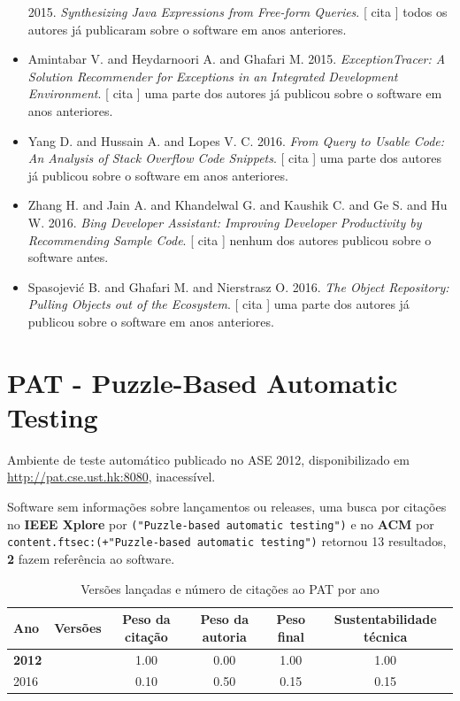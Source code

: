 \begin{itemize}
      2015.
        \textit{ Synthesizing Java Expressions from Free-form Queries}.
      [
          cita
      ]
todos os autores já publicaram sobre o software em anos anteriores.
\item Amintabar V. and Heydarnoori A. and Ghafari M.
      2015.
        \textit{ ExceptionTracer: A Solution Recommender for Exceptions in an Integrated Development Environment}.
      [
          cita
      ]
uma parte dos autores já publicou sobre o software em anos anteriores.
\item Yang D. and Hussain A. and Lopes V. C.
      2016.
        \textit{ From Query to Usable Code: An Analysis of Stack Overflow Code Snippets}.
      [
          cita
      ]
uma parte dos autores já publicou sobre o software em anos anteriores.
\item Zhang H. and Jain A. and Khandelwal G. and Kaushik C. and Ge S. and Hu W.
      2016.
        \textit{ Bing Developer Assistant: Improving Developer Productivity by Recommending Sample Code}.
      [
          cita
      ]
nenhum dos autores publicou sobre o software antes.
\item Spasojevi\'{c} B. and Ghafari M. and Nierstrasz O.
      2016.
        \textit{ The Object Repository: Pulling Objects out of the Ecosystem}.
      [
          cita
      ]
uma parte dos autores já publicou sobre o software em anos anteriores.
\end{itemize}
\section{PAT - Puzzle-Based Automatic Testing}

Ambiente de teste automático
publicado no ASE 2012,
disponibilizado em \url{http://pat.cse.ust.hk:8080},
inacessível.

Software sem informações sobre lançamentos ou releases,
uma busca por citações no {\bf IEEE Xplore} por
\texttt{("Puzzle-based automatic testing")}
e no {\bf ACM} por
\texttt{content.ftsec:(+"Puzzle-based automatic testing")}
retornou
13 resultados,
{\bf 2} fazem referência ao software.


\begin{table}[H]
\caption{Versões lançadas e número de citações ao PAT por ano}
\centering
\begin{tabular}{| l | c | c | c | c | c |}
  \hline
  Ano & Versões & Peso da citação & Peso da autoria & Peso final & Sustentabilidade técnica \\
  \hline
            {\bf 2012}
          &
          
          &
          1.00
          &
          0.00
          &
          1.00
          &
            {\color{blue} 1.00}
          \\
\hline
            2016
          &
          
          &
          0.10
          &
          0.50
          &
          0.15
          &
            {\color{red} 0.15}
          \\
\hline
\end{tabular}
\end{table}

